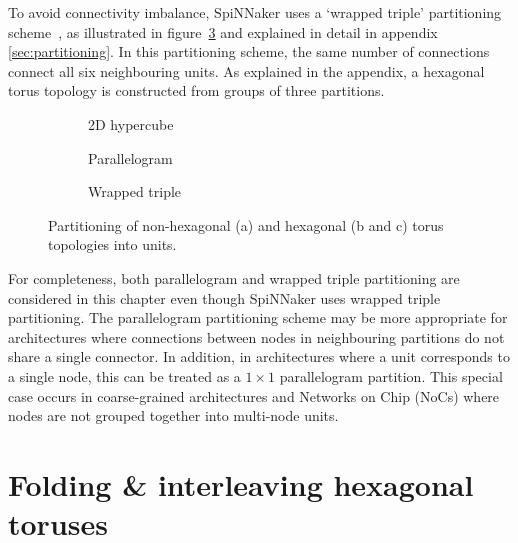 		To avoid connectivity imbalance, SpiNNaker uses a `wrapped triple'
		partitioning scheme~\cite{davidsonWiring}, as illustrated in
		figure~\ref{fig:wrapped-triple-partitioning} and explained in detail in
		appendix \ref{sec:partitioning}. In this partitioning scheme, the same
		number of connections connect all six neighbouring units. As explained in
		the appendix, a hexagonal torus topology is constructed from groups of
		three partitions.
		
		\begin{figure}
			\center
			\begin{subfigure}[b]{0.32\textwidth}
				\center
				\caption{2D hypercube}
				\label{fig:hypercube-partitioning}
			\end{subfigure}
			\begin{subfigure}[b]{0.32\textwidth}
				\center
				\caption{Parallelogram}
				\label{fig:parallelogram-partitioning}
			\end{subfigure}
			\begin{subfigure}[b]{0.32\textwidth}
				\center
				\caption{Wrapped triple}
				\label{fig:wrapped-triple-partitioning}
			\end{subfigure}
			
			\caption[Partitioning of torus topologies into units.]%
			{Partitioning of non-hexagonal (a) and hexagonal (b and c) torus
			topologies into units.}
			\label{fig:partitioning-options}
		\end{figure}
		
		For completeness, both parallelogram and wrapped triple partitioning are
		considered in this chapter even though SpiNNaker uses wrapped triple
		partitioning. The parallelogram partitioning scheme may be more appropriate
		for architectures where connections between nodes in neighbouring
		partitions do not share a single connector. In addition, in architectures
		where a unit corresponds to a single node, this can be treated as a $1
		\times 1$ parallelogram partition.  This special case occurs in
		coarse-grained architectures and Networks on Chip (NoCs) where nodes are
		not grouped together into multi-node units.
	
	\section{Folding \& interleaving hexagonal toruses}
		
